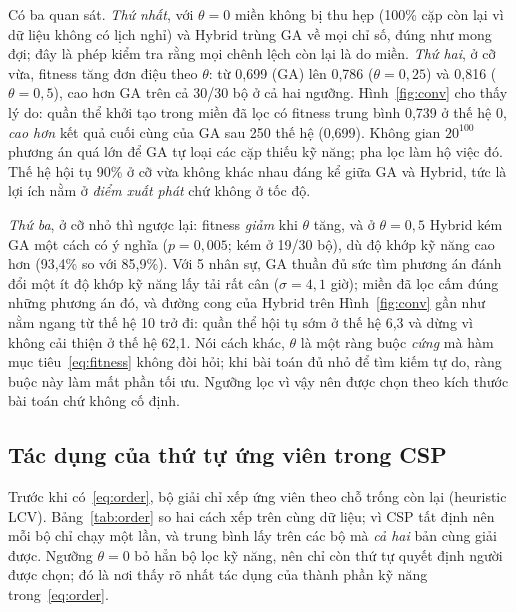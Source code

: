 \documentclass{IEEEtran}
\begin{document}
Có ba quan sát. \emph{Thứ nhất}, với $\theta=0$ miền không bị thu hẹp (100\% cặp còn lại vì dữ liệu không có lịch nghỉ) và Hybrid trùng GA về mọi chỉ số, đúng như mong đợi; đây là phép kiểm tra rằng mọi chênh lệch còn lại là do miền. \emph{Thứ hai}, ở cỡ vừa, fitness tăng đơn điệu theo $\theta$: từ 0,699 (GA) lên 0,786 ($\theta=0{,}25$) và 0,816 ($\theta=0{,}5$), cao hơn GA trên cả 30/30 bộ ở cả hai ngưỡng. Hình~\ref{fig:conv} cho thấy lý do: quần thể khởi tạo trong miền đã lọc có fitness trung bình 0,739 ở thế hệ 0, \emph{cao hơn} kết quả cuối cùng của GA sau 250 thế hệ (0,699). Không gian $20^{100}$ phương án quá lớn để GA tự loại các cặp thiếu kỹ năng; pha lọc làm hộ việc đó. Thế hệ hội tụ 90\% ở cỡ vừa không khác nhau đáng kể giữa GA và Hybrid, tức là lợi ích nằm ở \emph{điểm xuất phát} chứ không ở tốc độ.

\emph{Thứ ba}, ở cỡ nhỏ thì ngược lại: fitness \emph{giảm} khi $\theta$ tăng, và ở $\theta=0{,}5$ Hybrid kém GA một cách có ý nghĩa ($p=0{,}005$; kém ở 19/30 bộ), dù độ khớp kỹ năng cao hơn (93,4\% so với 85,9\%). Với 5 nhân sự, GA thuần đủ sức tìm phương án đánh đổi một ít độ khớp kỹ năng lấy tải rất cân ($\sigma=4{,}1$ giờ); miền đã lọc cấm đúng những phương án đó, và đường cong của Hybrid trên Hình~\ref{fig:conv} gần như nằm ngang từ thế hệ 10 trở đi: quần thể hội tụ sớm ở thế hệ 6,3 và dừng vì không cải thiện ở thế hệ 62,1. Nói cách khác, $\theta$ là một ràng buộc \emph{cứng} mà hàm mục tiêu~\eqref{eq:fitness} không đòi hỏi; khi bài toán đủ nhỏ để tìm kiếm tự do, ràng buộc này làm mất phần tối ưu. Ngưỡng lọc vì vậy nên được chọn theo kích thước bài toán chứ không cố định.

\subsection{Tác dụng của thứ tự ứng viên trong CSP}

Trước khi có~\eqref{eq:order}, bộ giải chỉ xếp ứng viên theo chỗ trống còn lại (heuristic LCV). Bảng~\ref{tab:order} so hai cách xếp trên cùng dữ liệu; vì CSP tất định nên mỗi bộ chỉ chạy một lần, và trung bình lấy trên các bộ mà \emph{cả hai} bản cùng giải được. Ngưỡng $\theta=0$ bỏ hẳn bộ lọc kỹ năng, nên chỉ còn thứ tự quyết định người được chọn; đó là nơi thấy rõ nhất tác dụng của thành phần kỹ năng trong~\eqref{eq:order}.
\end{document}
